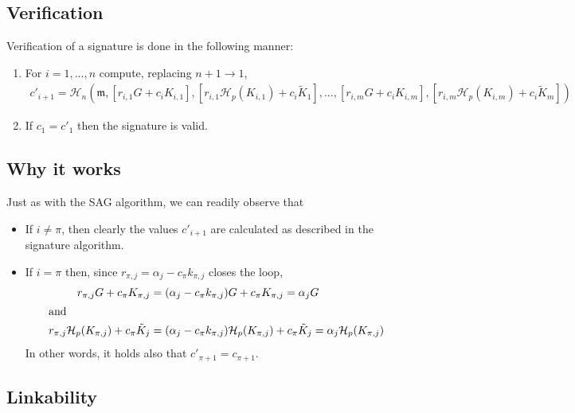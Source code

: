 \subsection*{Verification}

Verification of a signature is done in the following manner:

\begin{enumerate}
	\item For \(i = 1, ..., n\) compute, replacing \(n + 1 \rightarrow 1\),\vspace{.175cm}
	\begin{align*}
	c'_{i+1} = \mathcal{H}_n(\mathfrak{m}, [r_{i, 1} G + c_i K_{i, 1}], [r_{i, 1} \mathcal{H}_p(K_{i, 1}) + c_i \tilde{K}_1], 
	..., [r_{i, m} G + c_i K_{i, m}], [r_{i, m} \mathcal{H}_p(K_{i, m}) + c_i \tilde{K}_m])
	\end{align*}

	\item If \(c_1 = c'_1\) then the signature is valid.
\end{enumerate}


\subsection*{Why it works}

Just as with the SAG algorithm, we can readily observe that

\begin{itemize}
    \item If \(i \ne \pi \), then clearly the values \(c'_{i + 1}\) are calculated as described in the signature algorithm.

    \item If \(i = \pi\) then, since \(r_{\pi, j} = \alpha_j - c_\pi k_{\pi, j} \) closes the loop,\vspace{.175cm}
    \begin{alignat*}{6}
        r_{\pi, j} G + c_\pi K_{\pi,j} &= (\alpha_j - c_\pi k_{\pi, j}) G + c_\pi K_{\pi,j} = \alpha_j G\\
        \intertext{and}
        r_{\pi, j} \mathcal{H}_p(K_{\pi, j}) + c_\pi \tilde{K}_j &= (\alpha_j - c_\pi k_{\pi, j}) \mathcal{H}_p(K_{\pi, j}) + c_\pi \tilde{K}_j = \alpha_j \mathcal{H}_p(K_{\pi, j})\\
    \end{alignat*}
    In other words, it holds also that \(c'_{\pi + 1} = c_{\pi+1}\).
\end{itemize}


\subsection*{Linkability}

